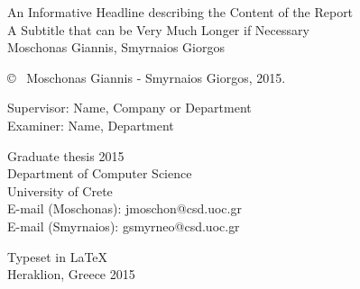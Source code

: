 \newpage
\thispagestyle{plain}
\vspace*{4.5cm}
An Informative Headline describing the Content of the Report\\
A Subtitle that can be Very Much Longer if Necessary\\
 Moschonas Giannis, Smyrnaios Giorgos \setlength{\parskip}{1cm}

\copyright ~  Moschonas Giannis - Smyrnaios Giorgos, 2015. \setlength{\parskip}{1cm}

Supervisor: Name, Company or Department\\
Examiner: Name, Department \setlength{\parskip}{1cm}

Graduate thesis 2015\\	%
Department of Computer Science\\
University of Crete\\
E-mail (Moschonas): jmoschon@csd.uoc.gr\\
E-mail (Smyrnaios): gsmyrneo@csd.uoc.gr\setlength{\parskip}{0.5cm}

\vfill

Typeset in \LaTeX \\
Heraklion, Greece 2015


